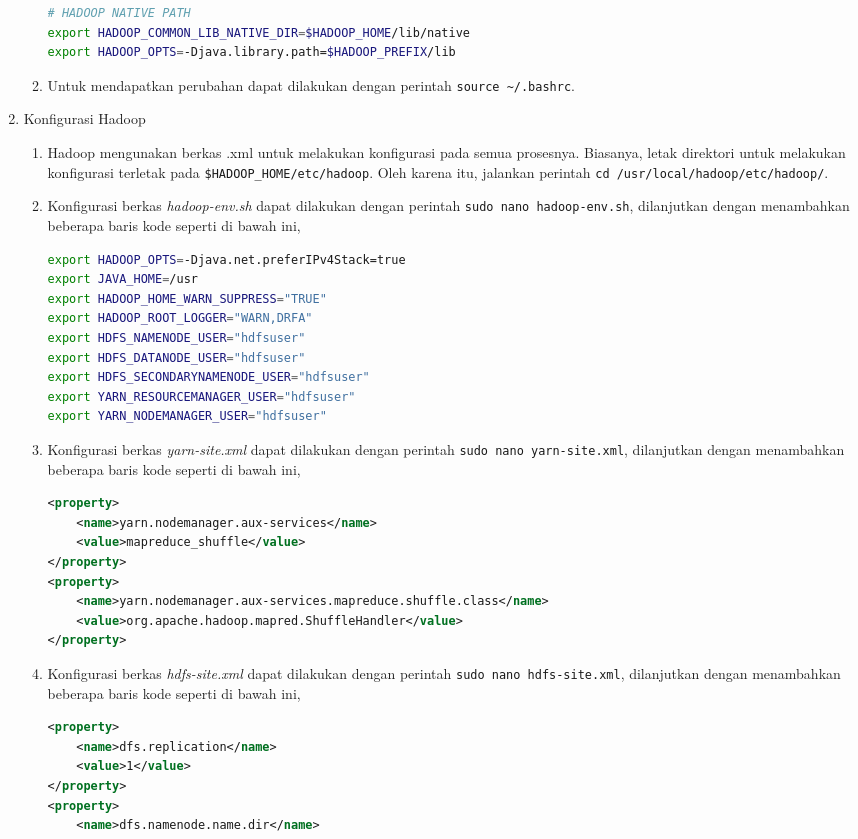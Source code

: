 \begin{enumerate}
\begin{enumerate}
\begin{lstlisting}[language=bash]
# HADOOP NATIVE PATH
export HADOOP_COMMON_LIB_NATIVE_DIR=$HADOOP_HOME/lib/native
export HADOOP_OPTS=-Djava.library.path=$HADOOP_PREFIX/lib
      \end{lstlisting}
    \item Untuk mendapatkan perubahan dapat dilakukan dengan perintah \verb|source ~/.bashrc|.
  \end{enumerate}
  \item Konfigurasi Hadoop
  \begin{enumerate}
    \item Hadoop mengunakan berkas .xml untuk melakukan konfigurasi pada semua prosesnya. Biasanya, letak direktori untuk melakukan konfigurasi terletak pada \verb|$HADOOP_HOME/etc/hadoop|. Oleh karena itu, jalankan perintah \verb|cd /usr/local/hadoop/etc/hadoop/|.
    \item Konfigurasi berkas \textit{hadoop-env.sh} dapat dilakukan dengan perintah \verb|sudo nano hadoop-env.sh|, dilanjutkan dengan menambahkan beberapa baris kode seperti di bawah ini,
       \begin{lstlisting}[language=bash]
export HADOOP_OPTS=-Djava.net.preferIPv4Stack=true
export JAVA_HOME=/usr
export HADOOP_HOME_WARN_SUPPRESS="TRUE"
export HADOOP_ROOT_LOGGER="WARN,DRFA"
export HDFS_NAMENODE_USER="hdfsuser"
export HDFS_DATANODE_USER="hdfsuser"
export HDFS_SECONDARYNAMENODE_USER="hdfsuser"
export YARN_RESOURCEMANAGER_USER="hdfsuser"
export YARN_NODEMANAGER_USER="hdfsuser"
      \end{lstlisting}
    \item Konfigurasi berkas \textit{yarn-site.xml} dapat dilakukan dengan perintah \verb|sudo nano yarn-site.xml|, dilanjutkan dengan menambahkan beberapa baris kode seperti di bawah ini,
       \begin{lstlisting}[language=XML]
<property>
	<name>yarn.nodemanager.aux-services</name>
	<value>mapreduce_shuffle</value>
</property>
<property>
	<name>yarn.nodemanager.aux-services.mapreduce.shuffle.class</name>
	<value>org.apache.hadoop.mapred.ShuffleHandler</value>
</property>
      \end{lstlisting}
    \item Konfigurasi berkas \textit{hdfs-site.xml} dapat dilakukan dengan perintah \verb|sudo nano hdfs-site.xml|, dilanjutkan dengan menambahkan beberapa baris kode seperti di bawah ini,
       \begin{lstlisting}[language=XML]
<property>
	<name>dfs.replication</name>
	<value>1</value>
</property>
<property>
	<name>dfs.namenode.name.dir</name>

\end{lstlisting}
\end{enumerate}
\end{enumerate}
